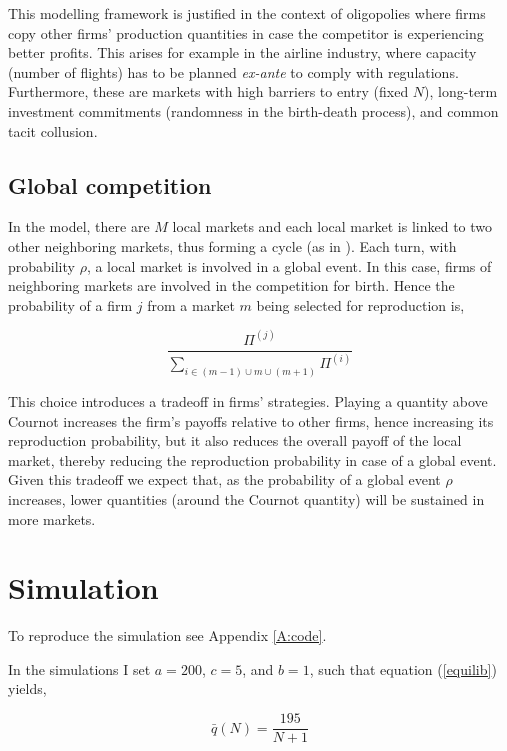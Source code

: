 \documentclass[american]{scrartcl}
\begin{document}
This modelling framework is justified in the context of oligopolies where firms copy other firms' production quantities in case the competitor is experiencing better profits. This arises for example in the airline industry, where capacity (number of flights) has to be planned \textit{ex-ante} to comply with regulations. Furthermore, these are markets with high barriers to entry (fixed $N$), long-term investment commitments (randomness in the birth-death process), and common tacit collusion.

\subsection{Global competition}

In the model, there are $M$ local markets and each local market is linked to two other neighboring markets, thus forming a cycle (as in \cite{Akdeniz2020}). Each turn, with probability $\rho$, a local market is involved in a global event. In this case, firms of neighboring markets are involved in the competition for birth. Hence the probability of a firm $j$ from a market $m$ being selected for reproduction is,

\begin{equation}
    \frac{\Pi^{(j)}}{\sum_{i \in (m-1) \cup m \cup (m+1)} \Pi^{(i)}}
\end{equation}

This choice introduces a tradeoff in firms' strategies. Playing a quantity above Cournot increases the firm's payoffs relative to other firms, hence increasing its reproduction probability, but it also reduces the overall payoff of the local market, thereby reducing the reproduction probability in case of a global event. Given this tradeoff we expect that, as the probability of a global event $\rho$ increases, lower quantities (around the Cournot quantity) will be sustained in more markets.

\section{Simulation}

To reproduce the simulation see Appendix \ref{A:code}.

In the simulations I set $a = 200$, $c = 5$, and $b = 1$, such that equation (\ref{equilib}) yields,

\begin{equation}
    \bar{q}(N) = \frac{195}{N+1}
\end{equation}
\end{document}
